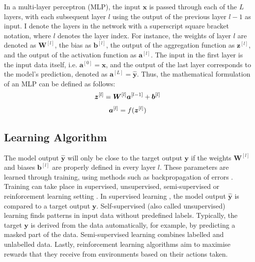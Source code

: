 In a multi-layer perceptron (MLP), the input \(\boldsymbol{x}\) is passed through each of the $L$ layers, with each subsequent layer \(l\) using the output of the previous layer \(l-1\) as input.
I denote the layers in the network with a superscript square bracket notation, where $l$ denotes the layer index. 
For instance, the weights of layer $l$ are denoted as $\boldsymbol{W}^{[l]}$, the bias as \(\boldsymbol{b}^{[l]}\), the output of the aggregation function as \(\boldsymbol{z}^{[l]}\), and the output of the activation function as \(\boldsymbol{a}^{[l]}\).
The input in the first layer is the input data itself, i.e. $\boldsymbol{a}^{[0]} = \boldsymbol{x}$, and the output of the last layer  corresponds to the model's prediction, denoted as $\boldsymbol{a}^{[L]} = \hat{\boldsymbol{y}}$. Thus,  the mathematical formulation of an MLP can be defined as follows:
%
\begin{align}\eqlbl{mlp}
		\boldsymbol{z}^{[l]} = \boldsymbol{W}^{[l]}\boldsymbol{a}^{[l-1]} + \boldsymbol{b}^{[l]}
\end{align}
%
\begin{align}\eqlbl{mlp2}
		\boldsymbol{a}^{[l]} = f(\boldsymbol{z}^{[l]})
\end{align}


\subsection{Learning Algorithm}
The model output $\boldsymbol{\hat{y}}$ will only be close to the target output $\boldsymbol{y}$ if the weights $\boldsymbol{W}^{[l]}$ and biases $\boldsymbol{b}^{[l]}$ are properly defined in every layer $l$.
These parameters are learned through training, using methods such as backpropagation of errors .
Training can take place in supervised, unsupervised, semi-supervised or reinforcement learning setting \cite{russell_artificial_2021, simmler_survey_2021}. In supervised learning \cite{cord_supervised_2008}, the model output $\boldsymbol{\hat{y}}$ is compared to a target output $\boldsymbol{\hat{y}}$. Self-supervised (also called unsupervised) learning \cite{liu_self-supervised_2021} finds patterns in input data without predefined labels. Typically, the target $\boldsymbol{y}$ is derived from the data automatically, for example, by predicting a masked part of the data. Semi-supervised learning \cite{van_engelen_survey_2020} combines labelled and unlabelled data. Lastly, reinforcement learning algorithms \cite{arulkumaran_deep_2017} aim to maximise rewards that they receive from environments based on their actions taken.

